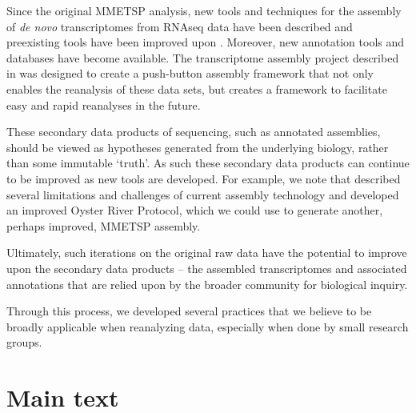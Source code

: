 \documentclass[a4paper,num-refs]{oup-contemporary}
\begin{document}
Since the original MMETSP analysis, new tools and techniques for the assembly of {\em de novo} transcriptomes from RNAseq data have been described and preexisting tools have been improved upon \cite{Grabherr2011}. Moreover, new annotation tools and databases have become available. The transcriptome assembly project described in \citet{Johnson2018} was designed to create a push-button assembly framework that not only enables the reanalysis of these data sets, but creates a framework to facilitate easy and rapid reanalyses in the future.

These secondary data products of sequencing, such as annotated
assemblies, should be viewed as hypotheses generated from the
underlying biology, rather than some immutable `truth'. As such these
secondary data products can continue to be improved as new tools are
developed.  For example, we note that \citet{MacManes177253} described several
limitations and challenges of current assembly technology and developed
an improved Oyster River Protocol, which we could use to generate another,
perhaps improved, MMETSP assembly.

Ultimately, such iterations on the original raw data have the
potential to improve upon the secondary data products -- the assembled
transcriptomes and associated annotations that are relied upon by the
broader community for biological inquiry.

Through this process, we developed several practices that we believe
to be broadly applicable when reanalyzing data, especially when done
by small research groups.


\section{Main text}
\end{document}
